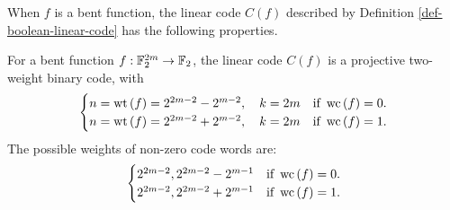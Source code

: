 When $f$ is a bent function, the linear code $C(f)$
described by Definition \ref{def-boolean-linear-code} has the following properties.
%
\begin{Proposition}
\label{pr-bent-two-weight-code}
\cite[Corollary 10]{Din2015}

For a bent function $f : \mathbb{F}_2^{2m} \rightarrow \mathbb{F}_2$, the linear code $C(f)$
is a projective two-weight binary code, with
\begin{align*}
\begin{cases}
n = \operatorname{wt}\left(f\right) = 2^{2m-2} - 2^{m-2}, \quad k = 2m & \text{if~} \operatorname{wc}\left(f\right)=0.
\\
n = \operatorname{wt}\left(f\right) = 2^{2m-2} + 2^{m-2}, \quad k = 2m & \text{if~} \operatorname{wc}\left(f\right)=1.
\end{cases}
\end{align*}
%
The possible weights of non-zero code words are:
\begin{align*}
\begin{cases}
2^{2m-2}, 2^{2m-2} - 2^{m-1} & \text{if~} \operatorname{wc}\left(f\right)=0.
\\
2^{2m-2}, 2^{2m-2} + 2^{m-1} & \text{if~} \operatorname{wc}\left(f\right)=1.
\end{cases}
\end{align*}
%
\end{Proposition}

